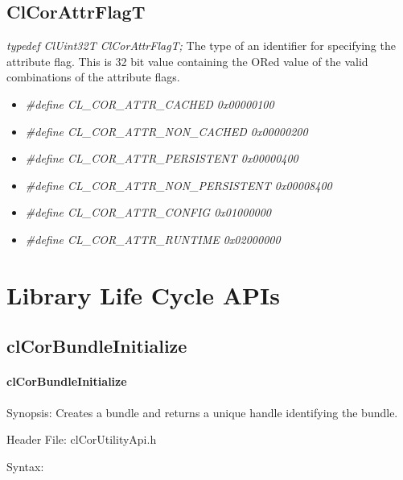 \begin{flushleft}
\subsection{ClCorAttrFlagT}
\textit{typedef ClUint32T ClCorAttrFlagT;}
\newline
\newline
The type of an identifier for specifying the attribute flag. This is 32 bit value containing the ORed value of the valid combinations of the attribute
flags.
\begin{itemize}
\item
\textit{\#define CL\_\-COR\_\-ATTR\_\-CACHED 0x00000100}
\item
\textit{\#define CL\_\-COR\_\-ATTR\_\-NON\_\-CACHED 0x00000200}
\item
\textit{\#define CL\_\-COR\_\-ATTR\_\-PERSISTENT 0x00000400}
\item
\textit{\#define CL\_\-COR\_\-ATTR\_\-NON\_\-PERSISTENT 0x00008400}
\item
\textit{\#define CL\_\-COR\_\-ATTR\_\-CONFIG 0x01000000}
\item
\textit{\#define CL\_\-COR\_\-ATTR\_\-RUNTIME 0x02000000}
\end{itemize}


\newpage
\section{Library Life Cycle APIs}
\subsection{clCorBundleInitialize}
\hypertarget{pagecor153}{}\paragraph{cl\-Cor\-Bundle\-Initialize}\label{pagecor153}
\begin{Desc}
\item[Synopsis:] Creates a bundle and returns a unique handle identifying the bundle.
\end{Desc}
\begin{Desc}
\item[Header File:]clCorUtilityApi.h\end{Desc}
\begin{Desc}
\item[Syntax:]


\end{Desc}
\end{flushleft}
